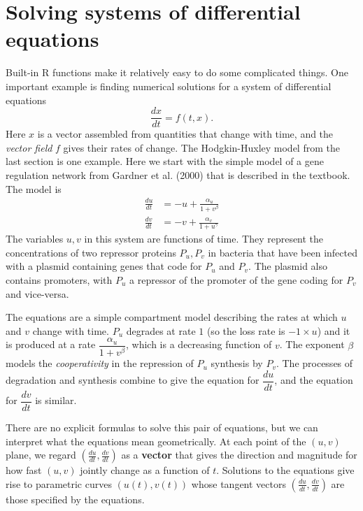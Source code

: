\documentclass [11pt]{article}
\numberwithin{exercise}{section}
\def\R{R }
\begin{document}
\section{Solving systems of differential equations} 
Built-in \R functions make it relatively easy to do some  
complicated things. One important example is finding numerical solutions
for a system of differential equations $$\frac{dx}{dt}=f(t,x).$$ 
Here $x$ is a vector assembled from quantities that change with time,
and the \textit{vector field} $f$ gives their rates of change. The Hodgkin-Huxley model from the
last section is one example. Here we start with the simple model of a gene regulation network 
from Gardner et al. (2000) that is described in the textbook. The model is 
\begin{equation}
\begin{split}
\frac{du}{dt} & =  -u + \frac{\alpha_u}{1+v^\beta} \\
\frac{dv}{dt} & =  -v + \frac{\alpha_v}{1+u^\gamma}
\end{split}
\label{ts_eqn}
\end{equation}
The variables $u,v$ in this system are functions of time. They
represent the concentrations of two repressor proteins $P_u, P_v$ in
bacteria that have been infected with a plasmid containing genes that
code for $P_u$ and $P_v$. The plasmid also contains promoters, with $P_u$ a
repressor of the promoter of the gene coding for $P_v$ and vice-versa.

The equations are a simple compartment model describing the 
rates at which $u$ and $v$ change with time. $P_u$ degrades at rate $1$ (so the
loss rate is $-1 \times u$) and it is 
produced at a rate $\dfrac{\alpha_u}{1+v^\beta}$, which is a decreasing
function of $v$. The exponent $\beta$ models the \textit{cooperativity} in
the repression of $P_u$ synthesis by $P_v$. The processes of
degradation and synthesis combine to give the equation for $\dfrac{du}{dt}$, and 
the equation for $\dfrac{dv}{dt}$ is similar.

There are no explicit formulas to solve this pair of equations, but we can
interpret what the equations mean geometrically. At each point of the
$(u,v)$ plane, we regard $ (\frac{du}{dt},\frac{dv}{dt})$ as a {\bf
vector} that gives the direction and magnitude for how fast $(u,v)$
jointly change as a function of $t$. Solutions to the equations give
rise to parametric curves $(u(t),v(t))$ whose tangent vectors $
(\frac{du}{dt},\frac{dv}{dt})$ are those specified by the equations.
\end{document}
